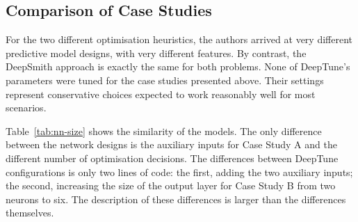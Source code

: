 \subsection{Comparison of Case Studies}

For the two different optimisation heuristics, the authors arrived at very different predictive model designs, with very different features. By contrast, the DeepSmith approach is exactly the same for both problems. None of DeepTune's parameters were tuned for the case studies presented above. Their settings represent conservative choices expected to work reasonably well for most scenarios.

Table~\ref{tab:nn-size} shows the similarity of the models. The only difference between the network designs is the auxiliary inputs for Case Study A and the different number of optimisation decisions. The differences between DeepTune configurations is only two lines of code: the first, adding the two auxiliary inputs; the second, increasing the size of the output layer for Case Study B from two neurons to six. The description of these differences is larger than the differences themselves.


